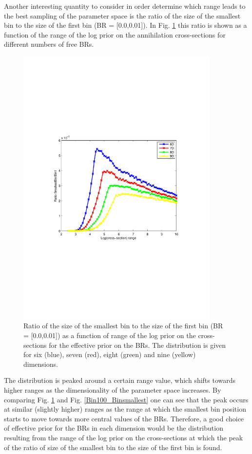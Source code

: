 \documentclass{article}
\begin{document}
Another interesting quantity to consider in order determine which range leads to the best sampling of the parameter space is the ratio of the size of the smallest bin to the size of the first bin (BR = [0.0,0.01]). In Fig. \ref{Binsmallest_Bin1} this ratio is shown as a function of the range of the log prior on the annihilation cross-sections for different numbers of free BRs.
\begin{figure}
\centering
\includegraphics[trim = 70 240 90 240, clip = true, width=0.9\textwidth]{figs/Ratio_Binsmallest_Bin1}
\caption{Ratio of the size of the smallest bin to the size of the first bin (BR = [0.0,0.01]) as a function of range of the log prior on the cross-sections for the effective prior on the BRs. The distribution is given for six (blue), seven (red), eight (green) and nine (yellow) dimensions.}
\label{Binsmallest_Bin1}
\end{figure}
The distribution is peaked around a certain range value, which shifts towards higher ranges as the dimensionality of the parameter space increases. By comparing Fig. \ref{Binsmallest_Bin1} and Fig. \ref{Bin100_Binsmallest} one can see that the peak occurs at similar (slightly higher) ranges as the range at which the smallest bin position starts to move towards more central values of the BRs. Therefore, a good choice of effective prior for the BRs in each dimension would be the distribution resulting from the range of the log prior on the cross-sections at which the peak of the ratio of size of the smallest bin to the size of the first bin is found.
\end{document}
